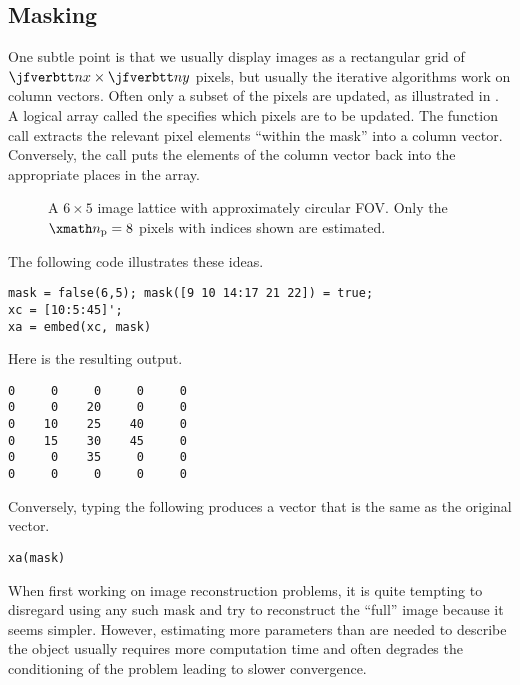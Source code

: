 
\subsection{Masking}

One subtle point is that we usually display images
as a rectangular grid of $\ty{nx} \times \ty{ny}$ pixels,
but usually the iterative algorithms
work on column vectors.
Often only a subset of the pixels are updated,
as illustrated in
.
A logical array called the 
specifies which pixels are to be updated.
The function call
extracts the relevant pixel elements
``within the mask''
into a column vector.
Conversely, the call
puts the elements of the column vector
back into the appropriate places
in the array.

\newcommand{\fdir}{book/c-reg/fig}

\begin{figure}
\cent{

}
\caption{
A $6 \times 5$
image lattice with approximately circular FOV. 
Only the $\np = 8$ pixels with indices shown are estimated.
}
\label{fig,reg,mask}
\end{figure}

The following code illustrates these ideas.

\begin{verbatim}
mask = false(6,5); mask([9 10 14:17 21 22]) = true;
xc = [10:5:45]';
xa = embed(xc, mask)
\end{verbatim}

\noindent
Here is the resulting output.

\begin{verbatim}
0     0     0     0     0
0     0    20     0     0
0    10    25    40     0
0    15    30    45     0
0     0    35     0     0
0     0     0     0     0
\end{verbatim}

\noindent
Conversely,
typing the following
produces a vector that is the same as the original  vector.
\begin{verbatim}
xa(mask)
\end{verbatim}

When first working on image reconstruction problems,
it is quite tempting to disregard
using any such mask
and try to reconstruct
the ``full'' image
because it seems simpler.
However,
estimating more parameters than are needed
to describe the object
usually requires more computation time
and often degrades the conditioning
of the problem
leading to slower convergence.
